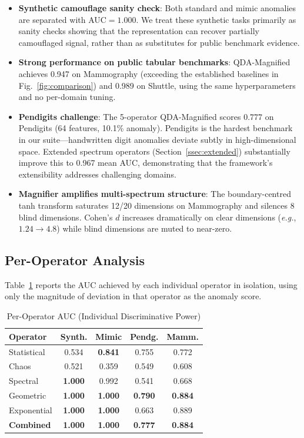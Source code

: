 \documentclass[journal]{IEEEtran}
\newcommand{\eg}{\textit{e.g.}}
\begin{document}
\begin{itemize}
  \item \textbf{Synthetic camouflage sanity check}: Both standard and mimic anomalies are separated with AUC$=1.000$. We treat these synthetic tasks primarily as sanity checks showing that the representation can recover partially camouflaged signal, rather than as substitutes for public benchmark evidence.
  \item \textbf{Strong performance on public tabular benchmarks}: QDA-Magnified achieves 0.947 on Mammography (exceeding the established baselines in Fig.~\ref{fig:comparison}) and 0.989 on Shuttle, using the same hyperparameters and no per-domain tuning.
  \item \textbf{Pendigits challenge}: The 5-operator QDA-Magnified scores 0.777 on Pendigits (64 features, 10.1\% anomaly). Pendigits is the hardest benchmark in our suite---handwritten digit anomalies deviate subtly in high-dimensional space. Extended spectrum operators (Section~\ref{ssec:extended}) substantially improve this to 0.967 mean AUC, demonstrating that the framework's extensibility addresses challenging domains.
  \item \textbf{Magnifier amplifies multi-spectrum structure}: The boundary-centred tanh transform saturates 12/20 dimensions on Mammography and silences 8 blind dimensions. Cohen's $d$ increases dramatically on clear dimensions (\eg, $1.24 \to 4.8$) while blind dimensions are muted to near-zero.
\end{itemize}

\subsection{Per-Operator Analysis}
\label{ssec:perlaw}

Table~\ref{tab:perlaw} reports the AUC achieved by each individual operator in isolation, using only the magnitude of deviation in that operator as the anomaly score.

\begin{table}[!t]
\centering
\caption{Per-Operator AUC (Individual Discriminative Power)}
\label{tab:perlaw}
\begin{tabular}{@{}lcccc@{}}
\toprule
\textbf{Operator} & \textbf{Synth.} & \textbf{Mimic} & \textbf{Pendg.} & \textbf{Mamm.} \\
\midrule
Statistical & 0.534 & \textbf{0.841} & 0.755 & 0.772 \\
Chaos & 0.521 & 0.359 & 0.549 & 0.608 \\
Spectral & \textbf{1.000} & 0.992 & 0.541 & 0.668 \\
Geometric & \textbf{1.000} & \textbf{1.000} & \textbf{0.790} & \textbf{0.884} \\
Exponential & \textbf{1.000} & \textbf{1.000} & 0.663 & 0.889 \\
\midrule
\textbf{Combined} & \textbf{1.000} & \textbf{1.000} & \textbf{0.777} & \textbf{0.884} \\
\bottomrule
\end{tabular}
\end{table}
\end{document}
